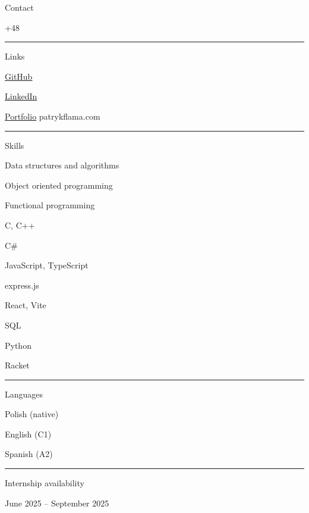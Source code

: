 \documentclass{letter}
\begin{document}
\begin{minipage}[t]{0.30\textwidth}
\setlength{\baselineskip}{1.5\baselineskip}
\begin{tcolorbox}[colback=darkblue!90!black, colframe=darkblue!90!black, sharp corners, height=\textheight]

\color{white}
\vspace{2cm}

{\large Contact}

\faPhone \quad +48 \ContactPhone

\faEnvelope \quad \href{mailto:\ContactEmail}{\ContactEmail}

\rule{\linewidth}{0.4pt}

{\large Links}

\faGithub \quad \href{https://github.com/\GitHubID}{GitHub\space\space} 
{\color{gray}\GitHubID}

\faLinkedin \quad \href{https://www.linkedin.com/in/\LinkedInID}{LinkedIn}
{\color{gray}\LinkedInID}

\faArrowCircleRight \quad \href{https://www.patrykflama.com}{Portfolio}
{\color{gray}patrykflama.com}

\rule{\linewidth}{0.4pt}

{\large Skills}

\faCircleNotch \quad Data structures and algorithms

\faCircleNotch \quad Object oriented programming

\faCircleNotch \quad Functional programming

\faCircleNotch \quad C, C++

\faCircleNotch \quad C\#

\faCircleNotch \quad JavaScript, TypeScript

\faCircleNotch \quad express.js

\faCircleNotch \quad React, Vite

\faCircleNotch \quad SQL

\faCircleNotch \quad Python

\faCircleNotch \quad Racket


\rule{\linewidth}{0.4pt}

{\large Languages}

\faLanguage \quad Polish {\color{gray}(native)}

\faLanguage \quad English {\color{gray}(C1)}

\faLanguage \quad Spanish {\color{gray}(A2)}


\rule{\linewidth}{0.4pt}

{\large Internship availability}

\faClock \quad June 2025 -- September 2025

\end{tcolorbox}
\end{minipage}
\end{document}
